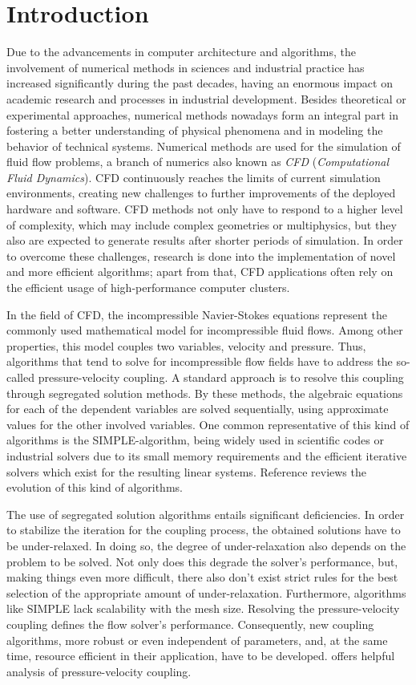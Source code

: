 \section{Introduction}

Due to the advancements in computer architecture and algorithms, the involvement of numerical methods in sciences and industrial practice has increased significantly during the past decades, having an enormous impact on academic research and processes in industrial development. Besides theoretical or experimental approaches, numerical methods nowadays form an integral part in fostering a better understanding of physical phenomena and in modeling the behavior of technical systems. Numerical methods are used for the simulation of fluid flow problems, a branch of numerics also known as \emph{CFD} (\emph{Computational Fluid Dynamics}). CFD continuously reaches the limits of current simulation environments, creating new challenges to further improvements of the deployed hardware and software. CFD methods not only have to respond to a higher level of complexity, which may include complex geometries or multiphysics, but they also are expected to generate results after shorter periods of simulation. In order to overcome these challenges, research is done into the implementation of novel and more efficient algorithms; apart from that, CFD applications often rely on the efficient usage of high-performance computer clusters. 

In the field of CFD, the incompressible Navier-Stokes equations represent the commonly used mathematical model for incompressible fluid flows. Among other properties, this model couples two variables, velocity and pressure. Thus, algorithms that tend to solve for incompressible flow fields have to address the so-called pressure-velocity coupling. A standard approach is to resolve this coupling through segregated solution methods. By these methods, the algebraic equations for each of the dependent variables are solved sequentially, using approximate values for the other involved variables. One common representative of this kind of algorithms is the SIMPLE-algorithm, being widely used in scientific codes or industrial solvers due to its small memory requirements and the efficient iterative solvers which exist for the resulting linear systems. Reference \cite{acharya07} reviews the evolution of this kind of algorithms.

The use of segregated solution algorithms entails significant deficiencies. In order to stabilize the iteration for the coupling process, the obtained solutions have to be under-relaxed. In doing so, the degree of under-relaxation also depends on the problem to be solved. Not only does this degrade the solver's performance, but, making things even more difficult, there also don't exist strict rules for the best selection of the appropriate amount of under-relaxation. Furthermore, algorithms like SIMPLE lack scalability with the mesh size. Resolving the pressure-velocity coupling defines the flow solver's performance. Consequently, new coupling algorithms, more robust or even independent of parameters, and, at the same time, resource efficient in their application, have to be developed. \cite{peric90} offers helpful analysis of pressure-velocity coupling.

